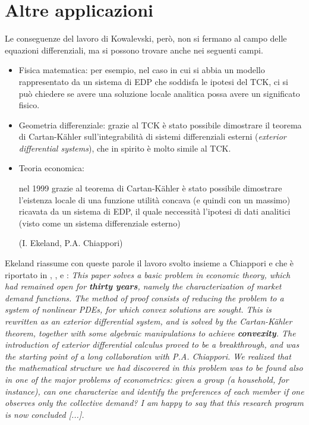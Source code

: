 \newpage
\section{Altre applicazioni}

Le conseguenze del lavoro di Kowalevski, però, non si fermano al campo delle equazioni differenziali, ma si possono trovare anche nei seguenti campi.

\begin{itemize}
\item Fisica matematica: per esempio, nel caso in cui si abbia un modello rappresentato da un sistema di EDP che soddisfa le ipotesi del TCK, ci si può chiedere se avere una soluzione locale analitica possa avere un significato fisico.
\item Geometria differenziale: grazie al TCK è stato possibile dimostrare il teorema di Cartan-Kähler sull'integrabilità di sistemi differenziali esterni (\textit{exterior differential systems}), che in spirito è molto simile al TCK.
\item Teoria economica: 

nel 1999
grazie al teorema di Cartan-Kähler è stato possibile dimostrare l'eistenza locale di una funzione utilità concava (e quindi con un massimo) ricavata da un sistema di EDP, il quale neccessità l'ipotesi di dati analitici (visto come un sistema differenziale esterno)

(I. Ekeland, P.A. Chiappori)
\end{itemize}

Ekeland riassume con queste parole il lavoro svolto insieme a Chiappori e che è riportato in \cite{CE}, \cite{CEgenchar}, \cite{CEaggregation} e \cite{CEid}:
\textit{This paper solves a basic problem in economic theory, which had remained open for \textbf{thirty years}, namely the characterization of market demand functions. The method of proof consists of reducing the problem to a system of nonlinear PDEs, for which convex solutions are sought. This is rewritten as an exterior differential system, and is solved by the Cartan-Kähler theorem, together with some algebraic manipulations to achieve \textbf{convexity}. The introduction of exterior differential calculus proved to be a breakthrough, and was the starting point of a long collaboration with P.A. Chiappori. We realized that the mathematical structure we had discovered in this problem was to be found also in one of the major problems of econometrics: given a group (a household, for instance), can one characterize and identify the preferences of each member if one observes only the collective demand? I am happy to say that this research program is now concluded [...].}

